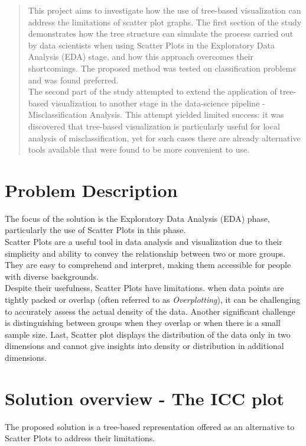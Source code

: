 \documentclass[11pt]{article}
\begin{document}
\maketitle

\begin{abstract}
This project aims to investigate how the use of tree-based visualization can address the limitations of scatter plot graphs. The first section of the study demonstrates how the tree structure can simulate the process carried out by data scientists when using Scatter Plots in the Exploratory Data Analysis (EDA) stage, and how this approach overcomes their shortcomings. 
The proposed method was tested on classification problems and was found preferred.\\
The second part of the study attempted to extend the application of tree-based visualization to another stage in the data-science pipeline - Misclassification Analysis. This attempt yielded limited success: it was discovered that tree-based visualization is particularly useful for local analysis of misclassification, yet for such cases there are already alternative tools available that were found to be more convenient to use.

\end{abstract}

\section{Problem Description}\label{Problem Description}
The focus of the solution is the Exploratory Data Analysis (EDA) phase, particularly the use of Scatter Plots in this phase.\\
Scatter Plots are a useful tool in data analysis and visualization due to their simplicity and ability to convey the relationship between two or more groups. They are easy to comprehend and interpret, making them accessible for people with diverse backgrounds.\\
Despite their usefulness, Scatter Plots have limitations. when data points are tightly packed or overlap (often referred to as \textit{Overplotting}), it can be challenging to accurately assess the actual density of the data. Another significant challenge is distinguishing between groups when they overlap or when there is a small sample size. Last, Scatter plot displays the distribution of the data only in two dimensions and cannot give insights into density or distribution in additional dimensions.

\section{Solution overview - The ICC plot}\label{Solution overview}
The proposed solution is a tree-based representation offered as an alternative to Scatter Plots to address their limitations.
\end{document}

